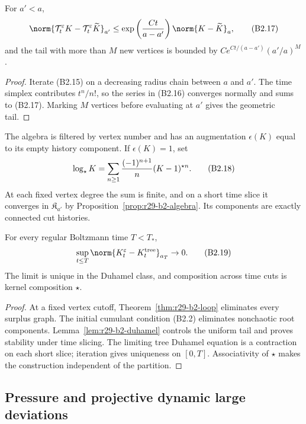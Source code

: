 \begin{lemma}
\label{lem:r29-b2-duhamel}
For $a'<a$,
\[
 \norm{\mathcal T_t^\varepsilon K-
       \mathcal T_t^\varepsilon\widetilde K}_{a'}
 \le \exp\left({Ct\over a-a'}\right)
\norm{K-\widetilde K}_a,             \tag{B2.17}
\]
and the tail with more than $M$ new vertices is bounded by
$C e^{Ct/(a-a')}(a'/a)^M$.
\end{lemma}

\begin{proof}
Iterate (B2.15) on a decreasing radius chain between $a$ and $a'$.  The time
simplex contributes $t^n/n!$, so the series in (B2.16) converges normally and
sums to (B2.17).  Marking $M$ vertices before evaluating at $a'$ gives the
geometric tail.
\end{proof}

The algebra is filtered by vertex number and has an augmentation
$\epsilon(K)$ equal to its empty history component.  If $\epsilon(K)=1$, set
\[
 \log_\star K=\sum_{n\ge1}{(-1)^{n+1}\over n}(K-1)^{\star n}.             \tag{B2.18}
\]
At each fixed vertex degree the sum is finite, and on a short time slice it
converges in $\mathfrak K_{a'}$ by Proposition~\ref{prop:r29-b2-algebra}.
Its components are exactly connected cut histories.

\begin{theorem}
\label{thm:r29-b2-propagation}
For every regular Boltzmann time $T<T_*$,
\[
 \sup_{t\le T}\norm{K_t^\varepsilon-K_t^{\rm tree}}_{a_T}\to0.          \tag{B2.19}
\]
The limit is unique in the Duhamel class, and composition across time cuts is
kernel composition $\star$.
\end{theorem}

\begin{proof}
At a fixed vertex cutoff, Theorem~\ref{thm:r29-b2-loop} eliminates every
surplus graph.  The initial cumulant condition (B2.2) eliminates nonchaotic
root components.  Lemma~\ref{lem:r29-b2-duhamel} controls the uniform tail and
proves stability under time slicing.  The limiting tree Duhamel equation is a
contraction on each short slice; iteration gives uniqueness on $[0,T]$.
Associativity of $\star$ makes the construction independent of the partition.
\end{proof}

\subsection{Pressure and projective dynamic large deviations}

